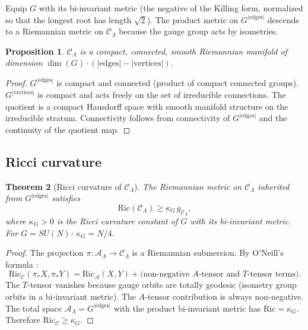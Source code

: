 \documentclass[11pt]{article}
\newtheorem{theorem}{Theorem}[section]
\newtheorem{proposition}[theorem]{Proposition}
\theoremstyle{definition}
\newcommand{\calA}{\mathcal{A}}
\newcommand{\calC}{\mathcal{C}}
\newcommand{\Ric}{\mathrm{Ric}}
\begin{document}
Equip $G$ with its bi-invariant metric (the negative of the Killing form, normalized so that the longest root has length $\sqrt{2}$). The product metric on $G^{|\text{edges}|}$ descends to a Riemannian metric on $\calC_\Lambda$ because the gauge group acts by isometries.

\begin{proposition}\label{prop:compact-connected}
$\calC_\Lambda$ is a compact, connected, smooth Riemannian manifold of dimension $\dim(G) \cdot (|\text{edges}| - |\text{vertices}|)$.
\end{proposition}

\begin{proof}
$G^{|\text{edges}|}$ is compact and connected (product of compact connected groups). $G^{|\text{vertices}|}$ is compact and acts freely on the set of irreducible connections. The quotient is a compact Hausdorff space with smooth manifold structure on the irreducible stratum. Connectivity follows from connectivity of $G^{|\text{edges}|}$ and the continuity of the quotient map.
\end{proof}

\subsection{Ricci curvature}

\begin{theorem}[Ricci curvature of $\calC_\Lambda$]\label{thm:ricci}
The Riemannian metric on $\calC_\Lambda$ inherited from $G^{|\text{edges}|}$ satisfies
\begin{equation}
    \Ric(\calC_\Lambda) \geq \kappa_G\, g_{\calC_\Lambda},
\end{equation}
where $\kappa_G > 0$ is the Ricci curvature constant of $G$ with its bi-invariant metric. For $G = SU(N)$: $\kappa_G = N/4$.
\end{theorem}

\begin{proof}
The projection $\pi: \calA_\Lambda \to \calC_\Lambda$ is a Riemannian submersion. By O'Neill's formula \cite{ONeill66}:
\begin{equation}
    \Ric_{\calC}(\pi_* X, \pi_* Y) = \Ric_{\calA}(X, Y) + \text{(non-negative $A$-tensor and $T$-tensor terms)}.
\end{equation}
The $T$-tensor vanishes because gauge orbits are totally geodesic (isometry group orbits in a bi-invariant metric). The $A$-tensor contribution is always non-negative. The total space $\calA_\Lambda = G^{|\text{edges}|}$ with the product bi-invariant metric has $\Ric = \kappa_G$. Therefore $\Ric_\calC \geq \kappa_G$.
\end{proof}
\end{document}
